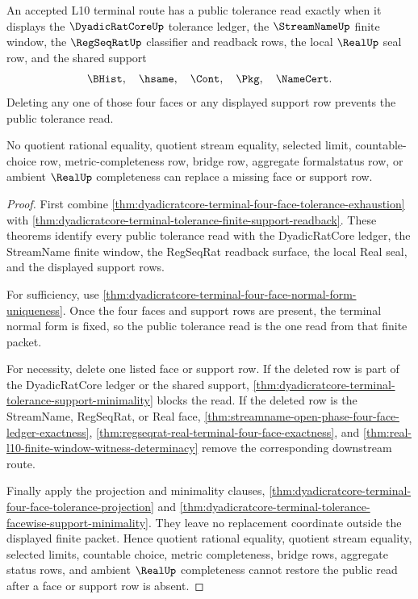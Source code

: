 \begin{theorem}
\label{thm:dyadicratcore-terminal-four-face-support}
An accepted L10 terminal route has a public tolerance read exactly when it displays the $\DyadicRatCoreUp$ tolerance ledger, the $\StreamNameUp$ finite window, the $\RegSeqRatUp$ classifier and readback rows, the local $\RealUp$ seal row, and the shared support
$$
\BHist,\quad \hsame,\quad \Cont,\quad \Pkg,\quad \NameCert.
$$
Deleting any one of those four faces or any displayed support row prevents the public tolerance read.

No quotient rational equality, quotient stream equality, selected limit, countable-choice row, metric-completeness row, bridge row, aggregate formalstatus row, or ambient $\RealUp$ completeness can replace a missing face or support row.
\end{theorem}
\begin{proof}
First combine \autoref{thm:dyadicratcore-terminal-four-face-tolerance-exhaustion} with \autoref{thm:dyadicratcore-terminal-tolerance-finite-support-readback}. These theorems identify every public tolerance read with the DyadicRatCore ledger, the StreamName finite window, the RegSeqRat readback surface, the local Real seal, and the displayed support rows.

For sufficiency, use \autoref{thm:dyadicratcore-terminal-four-face-normal-form-uniqueness}. Once the four faces and support rows are present, the terminal normal form is fixed, so the public tolerance read is the one read from that finite packet.

For necessity, delete one listed face or support row. If the deleted row is part of the DyadicRatCore ledger or the shared support, \autoref{thm:dyadicratcore-terminal-tolerance-support-minimality} blocks the read. If the deleted row is the StreamName, RegSeqRat, or Real face, \autoref{thm:streamname-open-phase-four-face-ledger-exactness}, \autoref{thm:regseqrat-real-terminal-four-face-exactness}, and \autoref{thm:real-l10-finite-window-witness-determinacy} remove the corresponding downstream route.

Finally apply the projection and minimality clauses, \autoref{thm:dyadicratcore-terminal-four-face-tolerance-projection} and \autoref{thm:dyadicratcore-terminal-tolerance-facewise-support-minimality}. They leave no replacement coordinate outside the displayed finite packet. Hence quotient rational equality, quotient stream equality, selected limits, countable choice, metric completeness, bridge rows, aggregate status rows, and ambient $\RealUp$ completeness cannot restore the public read after a face or support row is absent.
\end{proof}
